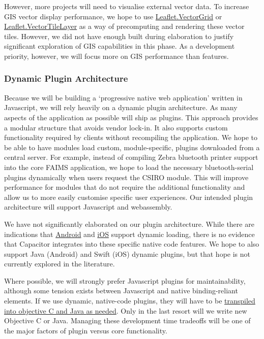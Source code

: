 \documentclass{faims3_report}
\begin{document}
However, more projects will need to visualise external vector data. To
increase GIS vector display performance, we hope to use
\href{https://github.com/Leaflet/Leaflet.VectorGrid}{{Leaflet.VectorGrid}}
or
\href{https://leafletjs.com/plugins.html\#vector-tiles}{{Leaflet.VectorTileLayer}}
as a way of precomputing and rendering these vector tiles. However, we
did not have enough built during elaboration to justify significant
exploration of GIS capabilities in this phase. As a development
priority, however, we will focus more on GIS performance than features.

\subsubsection{Dynamic Plugin
Architecture}

Because we will be building a `progressive native web application'
written in Javascript, we will rely heavily on a dynamic plugin
architecture. As many aspects of the application as possible will ship
as plugins. This approach provides a modular structure that avoids
vendor lock-in. It also supports custom functionality required by
clients without recompiling the application. We hope to be able to have
modules load custom, module-specific, plugins downloaded from a central
server. For example, instead of compiling Zebra bluetooth printer
support into the core FAIMS application, we hope to load the necessary
bluetooth-serial plugins dynamically when users request the CSIRO
module. This will improve performance for modules that do not require
the additional functionality and allow us to more easily customise
specific user experiences. Our intended plugin architecture will support
Javascript and webassembly.

We have not significantly elaborated on our plugin architecture. While
there are indications that
\href{https://developer.android.com/guide/app-bundle/play-feature-delivery}{{Android}}
and
\href{https://theswiftdev.com/building-and-loading-dynamic-libraries-at-runtime-in-swift/}{{iOS}}
support dynamic loading, there is no evidence that Capacitor integrates
into these specific native code features. We hope to also support Java
(Android) and Swift (iOS) dynamic plugins, but that hope is not
currently explored in the literature.

Where possible, we will strongly prefer Javascript plugins for
maintainability, although some tension exists between Javascript and
native binding-reliant elements. If we use dynamic, native-code plugins,
they will have to be
\href{https://www.joshmorony.com/creating-a-local-capacitor-plugin-to-access-native-functionality-ios-swift/}{{transpiled
into objective C and Java} {as needed}}. Only in the last resort will we
write new Objective C or Java. Managing these development time tradeoffs
will be one of the major factors of plugin versus core functionality.
\end{document}
